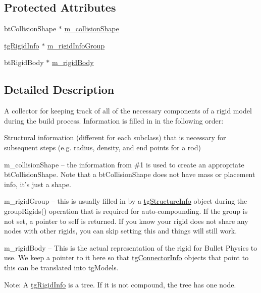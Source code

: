 \subsection*{Protected Attributes}
\begin{DoxyCompactItemize}
\item 
bt\-Collision\-Shape $\ast$ \hyperlink{classtg_rigid_info_a8a1c3ca00fe917c90d035e2ac101d4b1}{m\-\_\-collision\-Shape}
\item 
\hyperlink{classtg_rigid_info}{tg\-Rigid\-Info} $\ast$ \hyperlink{classtg_rigid_info_a410205a69125205c4d63883e1fcfb0ae}{m\-\_\-rigid\-Info\-Group}
\item 
bt\-Rigid\-Body $\ast$ \hyperlink{classtg_rigid_info_ab6e331d7cb329704f24a069ff3c309f3}{m\-\_\-rigid\-Body}
\end{DoxyCompactItemize}


\subsection{Detailed Description}
A collector for keeping track of all of the necessary components of a rigid model during the build process. Information is filled in in the following order\-:
\begin{DoxyEnumerate}
\item Structural information (different for each subclass) that is necessary for subsequent steps (e.\-g. radius, density, and end points for a rod)
\item m\-\_\-collision\-Shape -- the information from \#1 is used to create an appropriate bt\-Collision\-Shape. Note that a bt\-Collision\-Shape does not have mass or placement info, it's just a shape.
\item m\-\_\-rigid\-Group -- this is usually filled in by a \hyperlink{classtg_structure_info}{tg\-Structure\-Info} object during the group\-Rigids() operation that is required for auto-\/compounding. If the group is not set, a pointer to self is returned. If you know your rigid does not share any nodes with other rigids, you can skip setting this and things will still work.
\item m\-\_\-rigid\-Body -- This is the actual representation of the rigid for Bullet Physics to use. We keep a pointer to it here so that \hyperlink{classtg_connector_info}{tg\-Connector\-Info} objects that point to this can be translated into tg\-Models.
\end{DoxyEnumerate}

Note\-: A \hyperlink{classtg_rigid_info}{tg\-Rigid\-Info} is a tree. If it is not compound, the tree has one node. 

